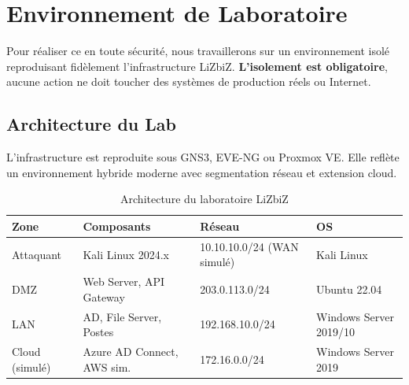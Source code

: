 \section{Environnement de Laboratoire}
\label{sec:lab}

Pour réaliser ce  en toute sécurité, nous travaillerons sur un
environnement isolé reproduisant fidèlement l'infrastructure LiZbiZ.
\textbf{L'isolement est obligatoire}, aucune action ne doit toucher des systèmes
de production réels ou Internet.

\subsection{Architecture du Lab}

L'infrastructure est reproduite sous GNS3, EVE-NG ou Proxmox VE. Elle reflète
un environnement hybride moderne avec segmentation réseau et extension cloud.

\begin{table}[htbp]
\centering
\caption{Architecture du laboratoire LiZbiZ}
\label{tab:lab_architecture}
\begin{tabular}{llll}
\toprule
\textbf{Zone} & \textbf{Composants} & \textbf{Réseau} & \textbf{OS} \\
\midrule
Attaquant
    & Kali Linux 2024.x
    & 10.10.10.0/24 (WAN simulé)
    & Kali Linux \\
DMZ
    & Web Server, API Gateway
    & 203.0.113.0/24
    & Ubuntu 22.04 \\
LAN
    & AD, File Server, Postes
    & 192.168.10.0/24
    & Windows Server 2019/10 \\
Cloud (simulé)
    & Azure AD Connect, AWS sim.
    & 172.16.0.0/24
    & Windows Server 2019 \\
\bottomrule
\end{tabular}
\end{table}

